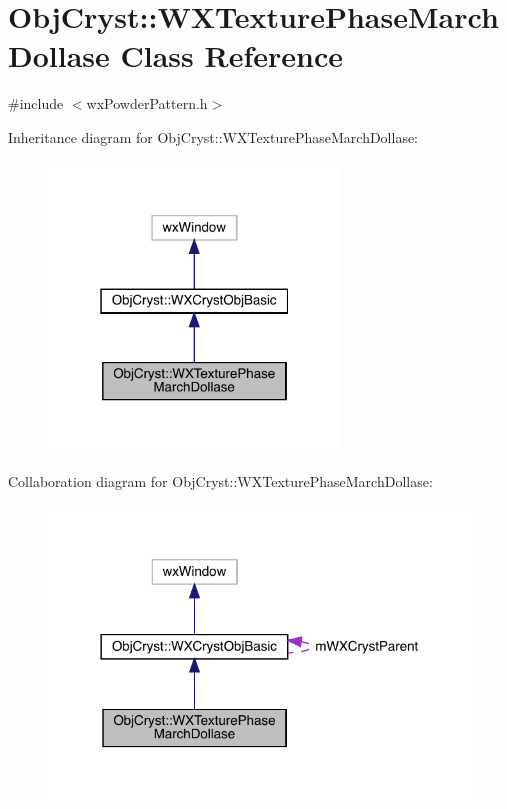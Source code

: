 \hypertarget{class_obj_cryst_1_1_w_x_texture_phase_march_dollase}{}\section{Obj\+Cryst\+::W\+X\+Texture\+Phase\+March\+Dollase Class Reference}
\label{class_obj_cryst_1_1_w_x_texture_phase_march_dollase}


{\ttfamily \#include $<$wx\+Powder\+Pattern.\+h$>$}



Inheritance diagram for Obj\+Cryst\+::W\+X\+Texture\+Phase\+March\+Dollase\+:
\nopagebreak
\begin{figure}[H]
\begin{center}
\leavevmode
\includegraphics[width=220pt]{class_obj_cryst_1_1_w_x_texture_phase_march_dollase__inherit__graph}
\end{center}
\end{figure}


Collaboration diagram for Obj\+Cryst\+::W\+X\+Texture\+Phase\+March\+Dollase\+:
\nopagebreak
\begin{figure}[H]
\begin{center}
\leavevmode
\includegraphics[width=318pt]{class_obj_cryst_1_1_w_x_texture_phase_march_dollase__coll__graph}
\end{center}
\end{figure}
